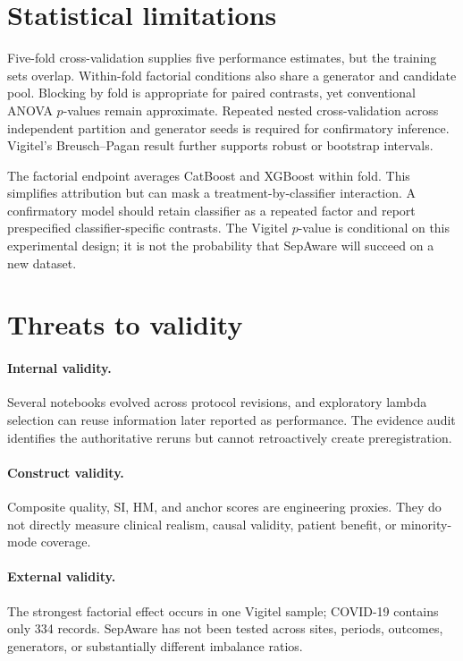 \section{Statistical limitations}

Five-fold cross-validation supplies five performance estimates, but the training sets overlap. Within-fold factorial conditions also share a generator and candidate pool. Blocking by fold is appropriate for paired contrasts, yet conventional ANOVA $p$-values remain approximate. Repeated nested cross-validation across independent partition and generator seeds is required for confirmatory inference. Vigitel's Breusch--Pagan result further supports robust or bootstrap intervals.

The factorial endpoint averages CatBoost and XGBoost within fold. This simplifies attribution but can mask a treatment-by-classifier interaction. A confirmatory model should retain classifier as a repeated factor and report prespecified classifier-specific contrasts. The Vigitel $p$-value is conditional on this experimental design; it is not the probability that SepAware will succeed on a new dataset.

\section{Threats to validity}

\paragraph{Internal validity.} Several notebooks evolved across protocol revisions, and exploratory lambda selection can reuse information later reported as performance. The evidence audit identifies the authoritative reruns but cannot retroactively create preregistration.

\paragraph{Construct validity.} Composite quality, SI, HM, and anchor scores are engineering proxies. They do not directly measure clinical realism, causal validity, patient benefit, or minority-mode coverage.

\paragraph{External validity.} The strongest factorial effect occurs in one Vigitel sample; COVID-19 contains only 334 records. SepAware has not been tested across sites, periods, outcomes, generators, or substantially different imbalance ratios.

